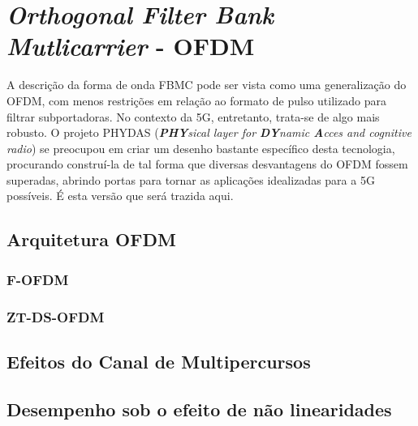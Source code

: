 \chapter{\textit{Orthogonal Filter Bank Mutlicarrier} - OFDM} \label{capitulo2}

A descrição da forma de onda FBMC pode ser vista como uma generalização do OFDM, com menos restrições em relação ao formato de pulso utilizado para filtrar subportadoras. No contexto da 5G, entretanto, trata-se de algo mais robusto. O projeto PHYDAS (\textit{\textbf{PHY}sical layer for \textbf{DY}namic \textbf{A}cces and cognitive radio}) \cite{phydas} se preocupou em criar um desenho bastante específico desta tecnologia, procurando construí-la de tal forma que diversas desvantagens do OFDM fossem superadas, abrindo portas para tornar as aplicações idealizadas para a 5G possíveis. É esta versão que será trazida aqui. 

\section{Arquitetura OFDM}\label{pulso} 

\subsection{F-OFDM}
\subsection{ZT-DS-OFDM}

\section{Efeitos do Canal de Multipercursos}

\section{Desempenho sob o efeito de não linearidades }
 



